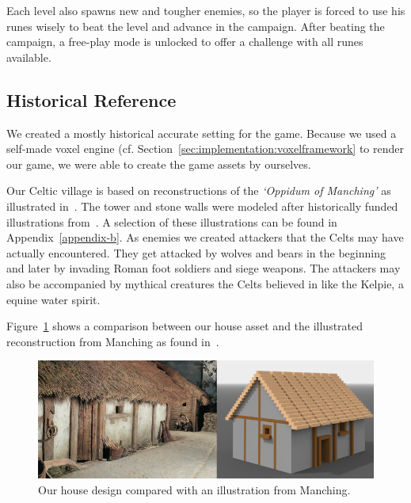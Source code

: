 Each level also spawns new and tougher enemies, so the player is forced to use his runes wisely to beat the level and advance in the campaign.
After beating the campaign, a free-play mode is unlocked to offer a challenge with all runes available.


\subsection{Historical Reference}
\label{sec:game_design:subsec:history}

We created a mostly historical accurate setting for the game. Because we used a self-made voxel engine (cf. Section~\ref{sec:implementation:voxelframework} to render our game, we were able to create the game assets by ourselves.

Our Celtic village is based on reconstructions of the \textit{`Oppidum of Manching'} as illustrated in~\cite{kraemer-oppidum-maching}. The tower and stone walls were modeled after historically funded illustrations from~\cite{kraemer-oppidum-maching}\cite{rieckhoff-walls1}\cite{rieckhoff-walls2}\cite{rieckhoff-tower}. A selection of these illustrations can be found in Appendix~\ref{appendix-b}. As enemies we created attackers that the Celts may have actually encountered.
They get attacked by wolves and bears in the beginning and later by invading Roman foot soldiers and siege weapons.
The attackers may also be accompanied by mythical creatures the Celts believed in like the Kelpie, a equine water spirit.

Figure~\ref{fig:house-comparison} shows a comparison between our house asset and the illustrated reconstruction from Manching as found in~\cite{kraemer-oppidum-maching}.

\begin{figure}[ht]
	\centering
	\includegraphics[width=\linewidth]{figures/house_comparison.png}
	\caption{Our house design compared with an illustration from Manching.}
	\label{fig:house-comparison}
\end{figure}







